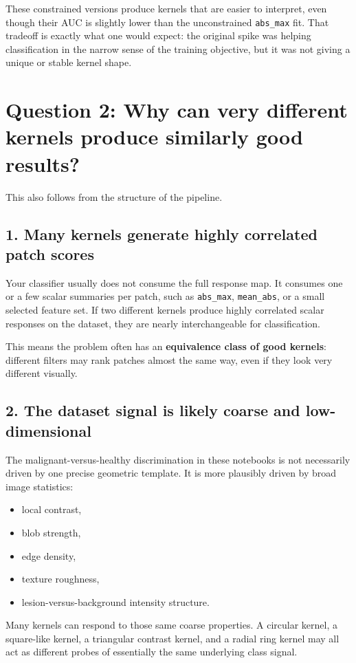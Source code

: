 \documentclass{article}
\begin{document}
These constrained versions produce kernels that are easier to interpret, even though their AUC is slightly lower than the unconstrained \texttt{abs\_max} fit. That tradeoff is exactly what one would expect: the original spike was helping classification in the narrow sense of the training objective, but it was not giving a unique or stable kernel shape.

\section*{Question 2: Why can very different kernels produce similarly good results?}

This also follows from the structure of the pipeline.

\subsection*{1. Many kernels generate highly correlated patch scores}
Your classifier usually does not consume the full response map. It consumes one or a few scalar summaries per patch, such as \texttt{abs\_max}, \texttt{mean\_abs}, or a small selected feature set. If two different kernels produce highly correlated scalar responses on the dataset, they are nearly interchangeable for classification.

This means the problem often has an \textbf{equivalence class of good kernels}: different filters may rank patches almost the same way, even if they look very different visually.

\subsection*{2. The dataset signal is likely coarse and low-dimensional}
The malignant-versus-healthy discrimination in these notebooks is not necessarily driven by one precise geometric template. It is more plausibly driven by broad image statistics:
\begin{itemize}
    \item local contrast,
    \item blob strength,
    \item edge density,
    \item texture roughness,
    \item lesion-versus-background intensity structure.
\end{itemize}

Many kernels can respond to those same coarse properties. A circular kernel, a square-like kernel, a triangular contrast kernel, and a radial ring kernel may all act as different probes of essentially the same underlying class signal.
\end{document}
